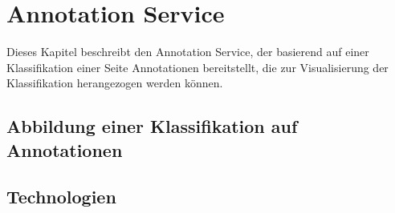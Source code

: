 \section{Annotation Service}
    \label{section:solutionDetailsAnnotationService}
    Dieses Kapitel beschreibt den Annotation Service,
    der basierend auf einer Klassifikation einer Seite Annotationen bereitstellt,
    die zur Visualisierung der Klassifikation herangezogen werden können.

    

    \subsection{Abbildung einer Klassifikation auf Annotationen}
        \label{section:solutionDetailsAnnotationServiceMapping}
    \subsection{Technologien}